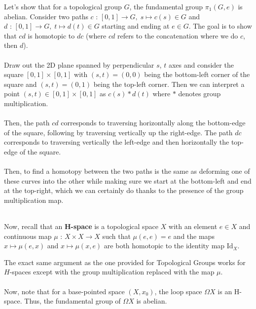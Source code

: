 \documentclass[11pt]{article}
\begin{document}
\vskip 0.5cm
Let's show that for a topological group $G$, the fundamental group $\pi_1(G, e)$ is abelian. Consider two paths $c\text{ : } [0, 1] \rightarrow G, \; s \mapsto c(s) \in G$ and $d\text{ : } [0, 1] \rightarrow G, \; t \mapsto d(t) \in G$ starting and ending at $e \in G$. The goal is to show that $cd$ is homotopic to $dc$ (where $cd$ refers to the concatenation where we do $c$, then $d$). 
\\
\\
Draw out the 2D plane spanned by perpendicular $s$, $t$ axes and consider the square $[0, 1] \times [0, 1]$ with $(s,t) = (0,0)$ being the bottom-left corner of the square and $(s,t)= (0, 1)$ being the top-left corner. Then we can interpret a point $(s, t) \in [0, 1] \times [0, 1]$ as $c(s) * d(t)$ where $*$ denotes group multiplication.
\\
\\
Then, the path $cd$ corresponds to traversing horizontally along the bottom-edge of the square, following by traversing vertically up the right-edge. The path $dc$ corresponds to traversing vertically the left-edge and then horizontally the top-edge of the square.
\\
\\
Then, to find a homotopy between the two paths is the same as deforming one of these curves into the other while making sure we start at the bottom-left and end at the top-right, which we can certainly do thanks to the presence of the group multiplication map.
\\
\\
\begin{redbox}
  Now, recall that an \textbf{H-space} is a topological space $X$ with an element $e \in X$ and continuous map $\mu \text{ : } X \times X \rightarrow X$ such that $\mu(e,e) = e$ and the maps $x \mapsto \mu(e, x)$ and $x \mapsto \mu(x, e)$ are both homotopic to the identity map $\mathrm{Id}_X$.
\end{redbox} 
The exact same argument as the one provided for Topological Groups works for $H$-spaces except with the group multiplication replaced with the map $\mu$.
\\
\\
Now, note that for a base-pointed space $(X, x_0)$, the loop space $\Omega X$ is an H-space. Thus, the fundamental group of $\Omega X$ is abelian.
\\
\end{document}
